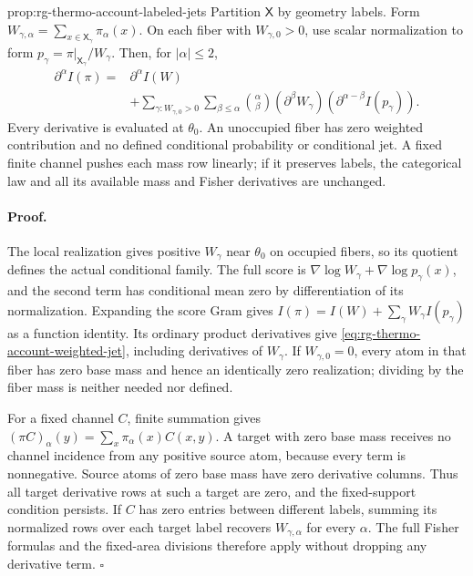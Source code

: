 {prop:rg-thermo-account-labeled-jets}
Partition $\mathsf X$ by geometry labels. Form
$W_{\gamma,\alpha}=\sum_{x\in\mathsf X_\gamma}\pi_\alpha(x)$.
On each fiber with $W_{\gamma,0}>0$, use scalar normalization to form
$p_\gamma=\pi|_{\mathsf X_\gamma}/W_\gamma$. Then, for
$|\alpha|\leq2$,
\begin{equation}
 \begin{aligned}
 \partial^\alpha I(\pi)
 ={}&\partial^\alpha I(W)\\
 &+\sum_{\gamma:W_{\gamma,0}>0}
   \sum_{\beta\leq\alpha}\binom\alpha\beta
       (\partial^\beta W_\gamma)
       (\partial^{\alpha-\beta}I(p_\gamma)).
 \end{aligned}
 \label{eq:rg-thermo-account-weighted-jet}
\end{equation}
Every derivative is evaluated at $\theta_0$. An unoccupied fiber has
zero weighted contribution and no defined conditional probability or
conditional jet. A fixed finite channel pushes each mass row linearly;
if it preserves labels, the categorical law and all its available
mass and Fisher derivatives are unchanged.\thermoestablishedstatus


\paragraph{Proof.}
The local realization gives positive $W_\gamma$ near $\theta_0$ on
occupied fibers, so its quotient defines the actual conditional family.
The full score is
$\nabla\log W_\gamma+\nabla\log p_\gamma(x)$, and the second
term has conditional mean zero by differentiation of its normalization.
Expanding the score Gram gives
$I(\pi)=I(W)+\sum_\gamma W_\gamma I(p_\gamma)$ as a function
identity. Its ordinary product derivatives give
\cref{eq:rg-thermo-account-weighted-jet}, including derivatives of
$W_\gamma$. If $W_{\gamma,0}=0$, every atom in that fiber has zero
base mass and hence an identically zero realization; dividing by the
fiber mass is neither needed nor defined.

For a fixed channel $C$, finite summation gives
$(\pi C)_\alpha(y)=\sum_x\pi_\alpha(x)C(x,y)$. A target with
zero base mass receives no channel incidence from any positive source
atom, because every term is nonnegative. Source atoms of zero base mass
have zero derivative columns. Thus all target derivative rows at such a
target are zero, and the fixed-support condition persists. If $C$ has
zero entries between different labels, summing its normalized rows over
each target label recovers $W_{\gamma,\alpha}$ for every $\alpha$.
The full Fisher formulas and the fixed-area divisions therefore apply
without dropping any derivative term. $\square$


